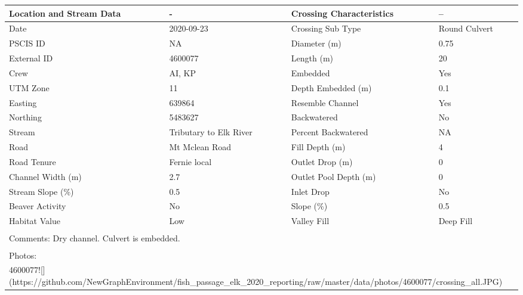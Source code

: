 \documentclass[
]{book}
\begin{document}
\begin{tabular}{l|l|l|l}
\hline
Location and Stream Data & - & Crossing Characteristics & --\\
\hline
Date & 2020-09-23 & Crossing Sub Type & Round Culvert\\
\hline
PSCIS ID & NA & Diameter (m) & 0.75\\
\hline
External ID & 4600077 & Length (m) & 20\\
\hline
Crew & AI, KP & Embedded & Yes\\
\hline
UTM Zone & 11 & Depth Embedded (m) & 0.1\\
\hline
Easting & 639864 & Resemble Channel & Yes\\
\hline
Northing & 5483627 & Backwatered & No\\
\hline
Stream & Tributary to Elk River & Percent Backwatered & NA\\
\hline
Road & Mt Mclean Road & Fill Depth (m) & 4\\
\hline
Road Tenure & Fernie local & Outlet Drop (m) & 0\\
\hline
Channel Width (m) & 2.7 & Outlet Pool Depth (m) & 0\\
\hline
Stream Slope (\%) & 0.5 & Inlet Drop & No\\
\hline
Beaver Activity & No & Slope (\%) & 0.5\\
\hline
Habitat Value & Low & Valley Fill & Deep Fill\\
\hline
\multicolumn{4}{l}{\textsuperscript{} Comments: Dry channel. Culvert is embedded.}\\
\multicolumn{4}{l}{\textsuperscript{} Photos:}\\
\multicolumn{4}{l}{4600077![](https://github.com/NewGraphEnvironment/fish\_passage\_elk\_2020\_reporting/raw/master/data/photos/4600077/crossing\_all.JPG)}\\
\end{tabular}
\end{document}
